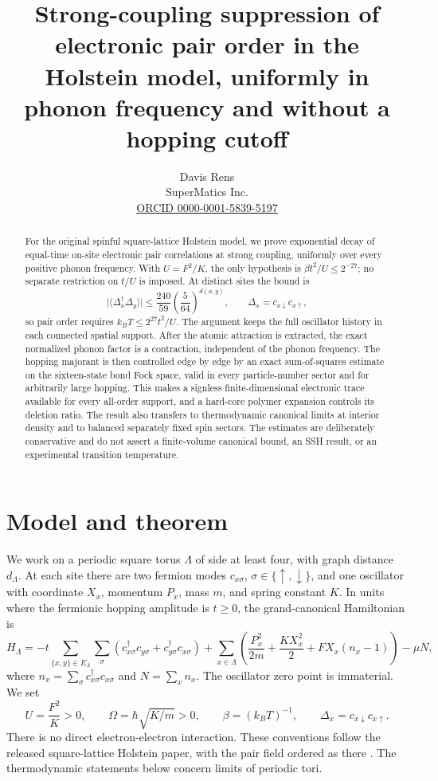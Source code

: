 \documentclass[11pt]{article}
\title{Strong-coupling suppression of electronic pair order in the Holstein model, uniformly in phonon frequency and without a hopping cutoff}
\author{Davis Rens\\SuperMatics Inc.\\\href{https://orcid.org/0000-0001-5839-5197}{ORCID 0000-0001-5839-5197}}
\date{}
\newcommand{\Deltaop}{\Delta}
\begin{document}
\maketitle

\begin{abstract}
For the original spinful square-lattice Holstein model, we prove exponential decay of equal-time on-site electronic pair correlations at strong coupling, uniformly over every positive phonon frequency. With $U=F^2/K$, the only hypothesis is $\beta t^2/U\le 2^{-27}$; no separate restriction on $t/U$ is imposed. At distinct sites the bound is
\[
 \bigl|\langle\Deltaop_x^\dagger\Deltaop_y\rangle\bigr|
 \le \frac{240}{59}\left(\frac{5}{64}\right)^{d(x,y)},
 \qquad \Deltaop_x=c_{x\downarrow}c_{x\uparrow},
\]
so pair order requires $k_BT\le 2^{27}t^2/U$. The argument keeps the full oscillator history in each connected spatial support. After the atomic attraction is extracted, the exact normalized phonon factor is a contraction, independent of the phonon frequency. The hopping majorant is then controlled edge by edge by an exact sum-of-squares estimate on the sixteen-state bond Fock space, valid in every particle-number sector and for arbitrarily large hopping. This makes a signless finite-dimensional electronic trace available for every all-order support, and a hard-core polymer expansion controls its deletion ratio. The result also transfers to thermodynamic canonical limits at interior density and to balanced separately fixed spin sectors. The estimates are deliberately conservative and do not assert a finite-volume canonical bound, an SSH result, or an experimental transition temperature.
\end{abstract}

\section{Model and theorem}

We work on a periodic square torus $\Lambda$ of side at least four, with graph distance $d_\Lambda$. At each site there are two fermion modes $c_{x\sigma}$, $\sigma\in\{\uparrow,\downarrow\}$, and one oscillator with coordinate $X_x$, momentum $P_x$, mass $m$, and spring constant $K$. In units where the fermionic hopping amplitude is $t\ge0$, the grand-canonical Hamiltonian is
\begin{equation}\label{eq:hamiltonian}
 H_\Lambda=-t\sum_{\{x,y\}\in E_\Lambda}\sum_\sigma
 (c_{x\sigma}^\dagger c_{y\sigma}+c_{y\sigma}^\dagger c_{x\sigma})
 +\sum_{x\in\Lambda}\left(\frac{P_x^2}{2m}+\frac{KX_x^2}{2}
 +F X_x(n_x-1)\right)-\mu N,
\end{equation}
where $n_x=\sum_\sigma c_{x\sigma}^\dagger c_{x\sigma}$ and $N=\sum_x n_x$. The oscillator zero point is immaterial. We set
\[
 U=\frac{F^2}{K}>0,\qquad \Omega=\hbar\sqrt{K/m}>0,\qquad
 \beta=(k_B T)^{-1},\qquad \Deltaop_x=c_{x\downarrow}c_{x\uparrow}.
\]
There is no direct electron-electron interaction. These conventions follow the released square-lattice Holstein paper, with the pair field ordered as there \cite{linear4,slow,cylinders}. The thermodynamic statements below concern limits of periodic tori.
\end{document}
